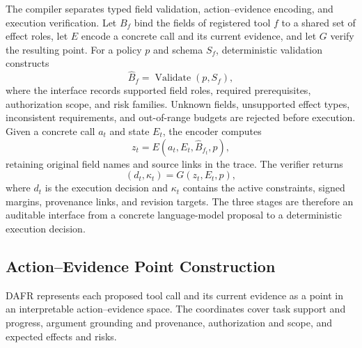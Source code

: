 \documentclass[letterpaper]{article}
\begin{document}
The compiler separates typed field validation, action--evidence encoding, and execution verification. Let $B_f$ bind the fields of registered tool $f$ to a shared set of effect roles, let $E$ encode a concrete call and its current evidence, and let $G$ verify the resulting point. For a policy $p$ and schema $S_f$, deterministic validation constructs
\begin{equation}
 \widehat B_f=\operatorname{Validate}(p,S_f),
 \label{eq:typed-interface}
\end{equation}
where the interface records supported field roles, required prerequisites, authorization scope, and risk families. Unknown fields, unsupported effect types, inconsistent requirements, and out-of-range budgets are rejected before execution. Given a concrete call $a_t$ and state $E_t$, the encoder computes
\begin{equation}
 z_t=E(a_t,E_t,\widehat B_{f_t},p),
 \label{eq:semantic-action-encoder}
\end{equation}
retaining original field names and source links in the trace. The verifier returns
\begin{equation}
 (d_t,\kappa_t)=G(z_t,E_t,p),
 \label{eq:certificate-verifier}
\end{equation}
where $d_t$ is the execution decision and $\kappa_t$ contains the active constraints, signed margins, provenance links, and revision targets. The three stages are therefore an auditable interface from a concrete language-model proposal to a deterministic execution decision.

\subsection{Action--Evidence Point Construction}

DAFR represents each proposed tool call and its current evidence as a point in an interpretable action--evidence space. The coordinates cover task support and progress, argument grounding and provenance, authorization and scope, and expected effects and risks.
\end{document}
